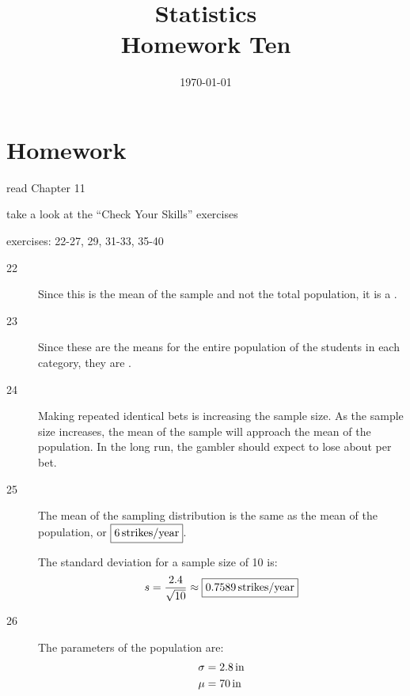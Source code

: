 \documentclass[letterpaper]{exam}
\title{Statistics \\ Homework Ten}
\date{\today}
\author{}
\newcommand{\cent}{\textcent\xspace}
\begin{document}
  \maketitle

  \section{Homework}
  \ifprintanswers
  \else
    \begin{itemize*}
      \item read Chapter 11 
      \item take a look at the ``Check Your Skills'' exercises
      \item exercises: 22-27, 29, 31-33, 35-40
    \end{itemize*}
  \fi

  \ifprintanswers
    \begin{description}

      \item[22] Since this is the mean of the sample and not the total
        population, it is a .

      \item[23] Since these are the means for the entire population of the
        students in each category, they are .

      \item[24] Making repeated identical bets is increasing the sample size.
        As the sample size increases, the mean of the sample will approach the
        mean of the population. In the long run, the gambler should expect to
        lose about \fbox{ 5.3\cent } per bet.

      \item[25] The mean of the sampling distribution is the same as the mean of
        the population, or $\boxed{ \unit[6]{strikes/year} }$.

        The standard deviation for a sample size of 10 is:
        \[
          s = \frac{2.4}{\sqrt{10}} \approx \boxed{ \unit[0.7589]{strikes/year} }
        \]

      \item[26]
        The parameters of the population are:
        \begin{align*}
          \sigma & = \unit[2.8]{in} \\
          \mu    & = \unit[70]{in} \\
        \end{align*}


\end{description}
\end{document}
